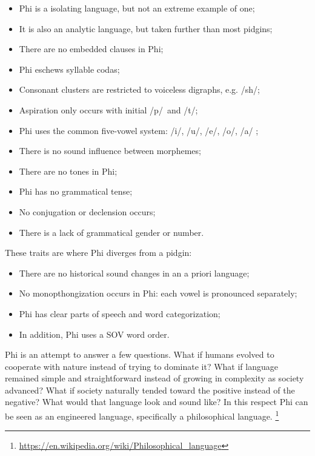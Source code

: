 \begin{itemize}[label=\raisebox{0.33ex}{\tiny$\bullet$},topsep=0pt]\itemsep-5pt
  \item Phi is a isolating language, but not an extreme example of one;
  \item It is also an analytic language, but taken further than most pidgins;
  \item There are no embedded clauses in Phi;
  \item Phi eschews syllable codas;
  \item Consonant clusters are restricted to voiceless digraphs,
  e.g. \dscopy /sh/\normalfont;
  \item Aspiration only occurs with initial \dscopy /p/~\normalfont and
  \dscopy /t/\normalfont;
  \item Phi uses the common five-vowel system: \dscopy /i/, /u/, /e/, /o/, /a/%
  \normalfont;
  \item There is no sound influence between morphemes;
  \item There are no tones in Phi;
  \item Phi has no grammatical tense;
  \item No conjugation or declension occurs;
  \item There is a lack of grammatical gender or number.
\end{itemize}

These traits are where Phi diverges from a pidgin:

\begin{itemize}[label=\raisebox{0.33ex}{\tiny$\bullet$},topsep=0pt]\itemsep-5pt
  \item There are no historical sound changes in an a priori language;
  \item No monopthongization occurs in Phi: each vowel is pronounced separately;
  \item Phi has clear parts of speech and word categorization;
  \item In addition, Phi uses a SOV word order.
\end{itemize}

Phi is an attempt to answer a few questions. What if humans evolved to cooperate
with nature instead of trying to dominate it? What if language remained simple
and straightforward instead of growing in complexity as society advanced? What
if society naturally tended toward the positive instead of the negative? What
would that language look and sound like? In this respect Phi can be seen as an
engineered language, specifically a philosophical language.%
\footnote{\url{https://en.wikipedia.org/wiki/Philosophical_language}}